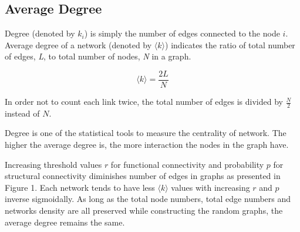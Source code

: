 \documentclass[12pt]{article}
\begin{document}
\subsection{Average Degree}

Degree (denoted by $k_i$) is simply the number of edges connected to the node $i$. Average degree of a network (denoted by $\langle k \rangle$) indicates the ratio of total number of edges, \textit{L}, to total number of nodes, \textit{N} in a graph.
 
\begin{equation}
\langle k \rangle = \frac{2L}{N}
\end{equation} 
 
In order not to count each link twice, the total number of edges is divided by $\frac{N}{2}$ instead of $N$. 
 

%
%
%
%
%
%
%
%
%
Degree is one of the statistical tools to measure the centrality of network. The higher the average degree is, the more interaction the nodes in the graph have. 

Increasing threshold values $r$ for functional connectivity and probability $p$ for structural connectivity diminishes number of edges in graphs as presented in Figure 1. Each network tends to have less $\langle k \rangle$ values with increasing $r$ and $p$ inverse sigmoidally.  As long as the total node numbers, total edge numbers and networks density are all preserved while constructing the random graphs, the average degree remains the same. 
%	
%
\end{document}
